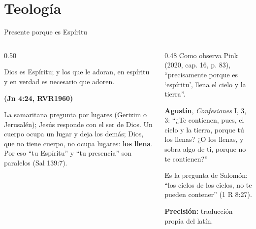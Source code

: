 \documentclass[hyperref={bookmarks=false},aspectratio=169]{beamer}
\newcommand{\fuente}[1]{\par\hfill{\upshape\bfseries\footnotesize\textcolor{azul}{#1}}}
\newcommand{\destacar}[1]{\textbf{\textcolor{azul}{#1}}}
\newcommand{\precision}[1]{{\footnotesize\color{gris}\textbf{Precisión:} #1}}
\begin{document}
\section{Teología}

\begin{frame}{Presente porque es Espíritu}
\begin{columns}[c,onlytextwidth]
\begin{column}{0.50\textwidth}
\begin{cita}[fontupper=\scriptsize\itshape]Dios es Espíritu; y los que le adoran, en espíritu y en verdad es necesario que adoren.\fuente{(Jn 4:24, RVR1960)}\end{cita}
\scriptsize La samaritana pregunta por lugares (Gerizim o Jerusalén); Jesús responde con el ser de Dios. Un cuerpo ocupa un lugar y deja los demás; Dios, que no tiene cuerpo, no ocupa lugares: \destacar{los llena}. Por eso ``tu Espíritu'' y ``tu presencia'' son paralelos (Sal 139:7).
\end{column}
\begin{column}{0.48\textwidth}\scriptsize
Como observa Pink (2020, cap. 16, p. 83), ``precisamente porque es `espíritu', llena el cielo y la tierra''.\par\medskip
\textbf{Agustín}, \emph{Confesiones} I, 3, 3: ``¿Te contienen, pues, el cielo y la tierra, porque tú los llenas? ¿O los llenas, y sobra algo de ti, porque no te contienen?''\par\smallskip
Es la pregunta de Salomón: ``los cielos de los cielos, no te pueden contener'' (1 R 8:27).\par\smallskip
\precision{traducción propia del latín.}
\end{column}
\end{columns}
\end{frame}
\end{document}
